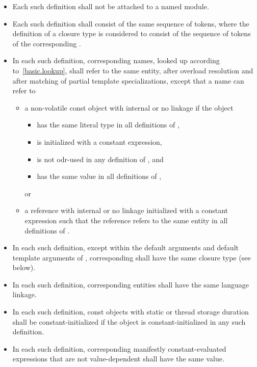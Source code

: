 \begin{itemize}
\item Each such definition
shall not be attached to a named module.
\item Each such definition shall consist of
the same sequence of tokens,
where the definition of a closure type
is considered to consist of the sequence of tokens of
the corresponding .
\item In each such definition, corresponding names, looked up
according to~\ref{basic.lookup}, shall refer to the same entity, after
overload resolution and after matching of partial
template specializations, except that a name can refer to
\begin{itemize}
\item
a non-volatile const object with internal or no linkage if the object
\begin{itemize}
\item has the same literal type in all definitions of ,
\item is initialized with a constant expression,
\item is not odr-used in any definition of , and
\item has the same value in all definitions of ,
\end{itemize}
or
\item
a reference with internal or no linkage
initialized with a constant expression such that
the reference refers to the same entity in all definitions of .
\end{itemize}

\item In each such definition, except within
the default arguments and default template arguments of ,
corresponding  shall have
the same closure type (see below).

\item In each such definition, corresponding entities shall have the
same language linkage.

\item In each such definition,
const objects with static or thread storage duration
shall be constant-initialized if
the object is constant-initialized in any such definition.

\item In each such definition,
corresponding manifestly constant-evaluated expressions
that are not value-dependent
shall have the same value.


\end{itemize}
